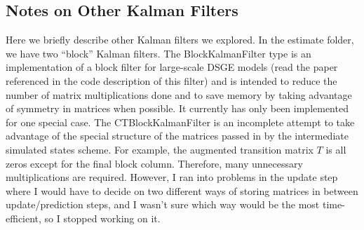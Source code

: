 \documentclass[12 pt, oneside]{article}
\theoremstyle{definition}
\theoremstyle{definition}
\theoremstyle{definition}
\begin{document}
\subsection{Notes on Other Kalman Filters}
Here we briefly describe other Kalman filters we explored. In the estimate folder, we have two ``block'' Kalman filters. The BlockKalmanFilter type is an implementation of a block filter for large-scale DSGE models (read the paper referenced in the code description of this filter) and is intended to reduce the number of matrix multiplications done and to save memory by taking advantage of symmetry in matrices when possible. It currently has only been implemented for one special case. The CTBlockKalmanFilter is an incomplete attempt to take advantage of the special structure of the matrices passed in by the intermediate simulated states scheme. For example, the augmented transition matrix $T$ is all zeros except for the final block column. Therefore, many unnecessary multiplications are required. However, I ran into problems in the update step where I would have to decide on two different ways of storing matrices in between update/prediction steps, and I wasn't sure which way would be the most time-efficient, so I stopped working on it.
\end{document}
